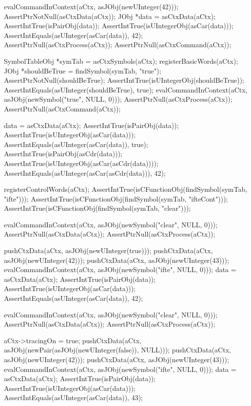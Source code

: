  evalCommandInContext(aCtx, asJObj(newUInteger(42)));
  AssertPtrNotNull(asCtxData(aCtx));
  JObj *data = asCtxData(aCtx);
  AssertIntTrue(isPairObj(data));
  AssertIntTrue(isUIntegerObj(asCar(data)));
  AssertIntEquals(asUInteger(asCar(data)), 42);
  AssertPtrNull(asCtxProcess(aCtx));
  AssertPtrNull(asCtxCommand(aCtx));

  SymbolTableObj *symTab = asCtxSymbols(aCtx);
  registerBasicWords(aCtx);
  JObj *shouldBeTrue = findSymbol(symTab, "true");
  AssertPtrNotNull(shouldBeTrue);
  AssertIntTrue(isUIntegerObj(shouldBeTrue));
  AssertIntEquals(asUInteger(shouldBeTrue), true);
  evalCommandInContext(aCtx, asJObj(newSymbol("true", NULL, 0)));
  AssertPtrNull(asCtxProcess(aCtx));
  AssertPtrNull(asCtxCommand(aCtx));  

  data = asCtxData(aCtx);
  AssertIntTrue(isPairObj(data));
  AssertIntTrue(isUIntegerObj(asCar(data)));
  AssertIntEquals(asUInteger(asCar(data)), true);
  AssertIntTrue(isPairObj(asCdr(data)));
  AssertIntTrue(isUIntegerObj(asCar(asCdr(data))));
  AssertIntEquals(asUInteger(asCar(asCdr(data))), 42);
    
  registerControlWords(aCtx);
  AssertIntTrue(isCFunctionObj(findSymbol(symTab, "ifte")));
  AssertIntTrue(isCFunctionObj(findSymbol(symTab, "ifteCont")));
  AssertIntTrue(isCFunctionObj(findSymbol(symTab, "clear")));
  
  evalCommandInContext(aCtx, asJObj(newSymbol("clear", NULL, 0)));
  AssertPtrNull(asCtxData(aCtx));
  AssertPtrNull(asCtxProcess(aCtx));
  
  pushCtxData(aCtx, asJObj(newUInteger(true)));
  pushCtxData(aCtx, asJObj(newUInteger(42)));
  pushCtxData(aCtx, asJObj(newUInteger(43)));
  evalCommandInContext(aCtx, asJObj(newSymbol("ifte", NULL, 0)));
  data = asCtxData(aCtx);
  AssertIntTrue(isPairObj(data));
  AssertIntTrue(isUIntegerObj(asCar(data)));
  AssertIntEquals(asUInteger(asCar(data)), 42);
  
  evalCommandInContext(aCtx, asJObj(newSymbol("clear", NULL, 0)));
  AssertPtrNull(asCtxData(aCtx));
  AssertPtrNull(asCtxProcess(aCtx));
  
  aCtx->tracingOn = true;
  pushCtxData(aCtx, asJObj(newPair(asJObj(newUInteger(false)), NULL)));
  pushCtxData(aCtx, asJObj(newUInteger(42)));
  pushCtxData(aCtx, asJObj(newUInteger(43)));
  evalCommandInContext(aCtx, asJObj(newSymbol("ifte", NULL, 0)));
  data = asCtxData(aCtx);
  AssertIntTrue(isPairObj(data));
  AssertIntTrue(isUIntegerObj(asCar(data)));
  AssertIntEquals(asUInteger(asCar(data)), 43);
\stopCTest

\stopTestCase
\stopTestSuite
